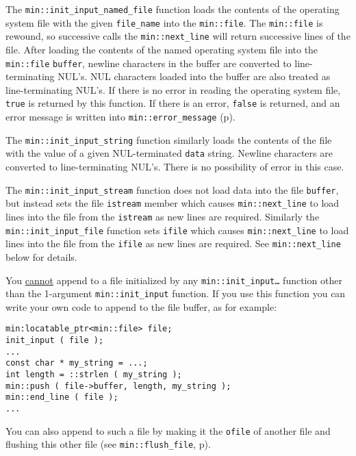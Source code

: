 \documentclass[12pt]{article}
\newcommand{\pagref}[1]{p\pageref{#1}}
\newcommand{\EOL}{\penalty \exhyphenpenalty}
\newenvironment{indpar}[1][0.3in]%
	{\begin{list}{}%
		     {\setlength{\itemsep}{0in}%
		      \setlength{\topsep}{0in}%
		      \setlength{\parsep}{1ex}%
		      \setlength{\labelwidth}{#1}%
		      \setlength{\leftmargin}{#1}%
		      \addtolength{\leftmargin}{\labelsep}}%
	 \item}%
	{\end{list}}
\begin{document}
The {\tt min::init\_input\_named\_file} function loads the contents
of the operating system
file with the given {\tt file\_\EOL name} into the {\tt min::file}.  The
{\tt min::file}
is rewound, so successive calls the {\tt min::\EOL next\_\EOL line}
will return successive lines of the file.  After loading the contents
of the named operating system file
into the {\tt min::file} {\tt buffer}, newline characters in the buffer
are converted to line-terminating NUL's.  NUL characters loaded into the
buffer are also treated as line-terminating NUL's.  If there is no error in
reading the operating system file, {\tt true} is returned by this function.  If
there is an error, {\tt false} is returned, and an error message
is written into {\tt min::\EOL error\_\EOL message}
(\pagref{ERROR_MESSAGE}).

The {\tt min::init\_input\_string} function similarly loads the contents
of the file with the value of a given NUL-terminated {\tt data} string.
Newline characters are converted to line-terminating NUL's.
There is no possibility of error in this case.

The {\tt min::init\_input\_stream} function does not load data into
the file {\tt buffer}, but instead sets the file {\tt istream} member
which causes {\tt min::\EOL next\_\EOL line} to load lines into the
file from the {\tt istream} as new lines are required.  Similarly
the {\tt min::\EOL init\_\EOL input\_\EOL file} function sets
{\tt ifile} which causes {\tt min::\EOL next\_\EOL line} to load lines
into the file from the {\tt ifile} as new lines are required.
See {\tt min::\EOL next\_\EOL line} below for details.

You \underline{cannot} append to a file initialized by any
{\tt min::\EOL init\_\EOL input\ldots} function other than
the 1-argument {\tt min::\EOL init\_\EOL input} function.
If you use this function you can write your own code to append
to the file buffer, as for example:
\begin{indpar}\begin{verbatim}
min:locatable_ptr<min::file> file;
init_input ( file );
...
const char * my_string = ...;
int length = ::strlen ( my_string );
min::push ( file->buffer, length, my_string );
min::end_line ( file );
...
\end{verbatim}\end{indpar}

You can also append to such a file by making it the {\tt ofile}
of another file and flushing this other file
(see {\tt min::\EOL flush\_\EOL file}, \pagref{MIN::FLUSH_FILE}).
\end{document}

